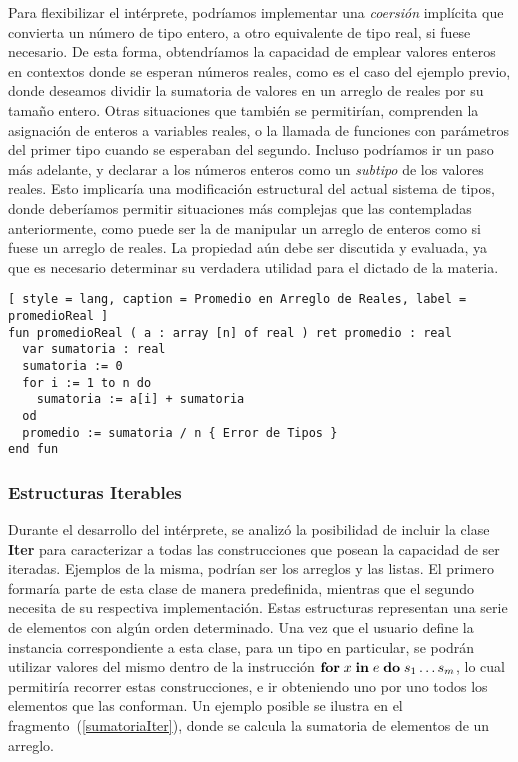 Para flexibilizar el intérprete, podríamos implementar una \textit{coersión} implícita que convierta un número de tipo entero, a otro equivalente de tipo real, si fuese necesario.
De esta forma, obtendríamos la capacidad de emplear valores enteros en contextos donde se esperan números reales, como es el caso del ejemplo previo, donde deseamos dividir la sumatoria de valores en un arreglo de reales por su tamaño entero.
Otras situaciones que también se permitirían, comprenden la asignación de enteros a variables reales, o la llamada de funciones con parámetros del primer tipo cuando se esperaban del segundo.
Incluso podríamos ir un paso más adelante, y declarar a los números enteros como un \textit{subtipo} de los valores reales.
Esto implicaría una modificación estructural del actual sistema de tipos, donde deberíamos permitir situaciones más complejas que las contempladas anteriormente, como puede ser la de manipular un arreglo de enteros como si fuese un arreglo de reales.
La propiedad aún debe ser discutida y evaluada, ya que es necesario determinar su verdadera utilidad para el dictado de la materia.

\begin{lstlisting}[ style = lang, caption = Promedio en Arreglo de Reales, label = promedioReal ]
fun promedioReal ( a : array [n] of real ) ret promedio : real
  var sumatoria : real
  sumatoria := 0
  for i := 1 to n do
    sumatoria := a[i] + sumatoria
  od
  promedio := sumatoria / n { Error de Tipos }
end fun
\end{lstlisting}

\subsubsection{Estructuras Iterables}

Durante el desarrollo del intérprete, se analizó la posibilidad de incluir la clase \textbf{Iter} para caracterizar a todas las construcciones que posean la capacidad de ser iteradas.
Ejemplos de la misma, podrían ser los arreglos y las listas.
El primero formaría parte de esta clase de manera predefinida, mientras que el segundo necesita de su respectiva implementación.
Estas estructuras representan una serie de elementos con algún orden determinado.
Una vez que el usuario define la instancia correspondiente a esta clase, para un tipo en particular, se podrán utilizar valores del mismo dentro de la instrucción $\mathbf{for} \; x \; \mathbf{in} \; e \; \mathbf{do} \; s_{1} \ldots s_{m}$, lo cual permitiría recorrer estas construcciones, e ir obteniendo uno por uno todos los elementos que las conforman.
Un ejemplo posible se ilustra en el fragmento~(\ref{sumatoriaIter}), donde se calcula la sumatoria de elementos de un arreglo.

